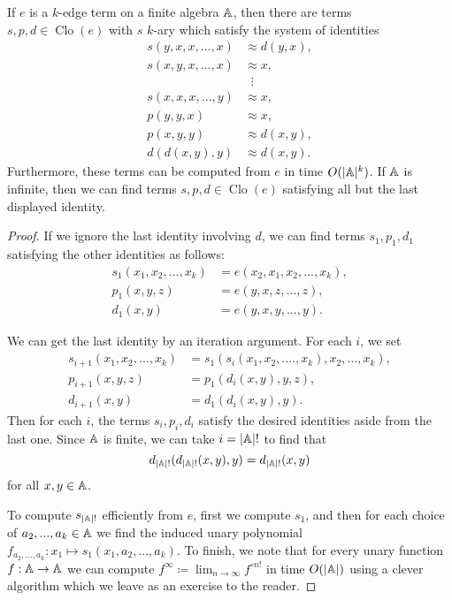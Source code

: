 \documentclass[letterpaper,11pt]{article}
\DeclareMathOperator{\Clo}{Clo}
\begin{document}
\begin{thm}\label{edge-spd} If $e$ is a $k$-edge term on a finite algebra $\mathbb{A}$, then there are terms $s,p,d \in \Clo(e)$ with $s$ $k$-ary which satisfy the system of identities
\begin{align*}
s(y,x,x,...,x) &\approx d(y,x),\\
s(x,y,x,...,x) &\approx x,\\
&\;\; \vdots\\
s(x,x,x,...,y) &\approx x,\\
p(y,y,x) &\approx x,\\
p(x,y,y) &\approx d(x,y),\\
d(d(x,y),y) &\approx d(x,y).
\end{align*}
Furthermore, these terms can be computed from $e$ in time $O(|\mathbb{A}|^k)$. If $\mathbb{A}$ is infinite, then we can find terms $s,p,d \in \Clo(e)$ satisfying all but the last displayed identity.
\end{thm}
\begin{proof} If we ignore the last identity involving $d$, we can find terms $s_1,p_1,d_1$ satisfying the other identities as follows:
\begin{align*}
s_1(x_1, x_2, ..., x_k) &= e(x_2,x_1,x_2, ..., x_k),\\
p_1(x,y,z) &= e(y,x,z,...,z),\\
d_1(x,y) &= e(y,x,y,...,y).
\end{align*}

We can get the last identity by an iteration argument. For each $i$, we set
\begin{align*}
s_{i+1}(x_1,x_2, ..., x_k) &= s_1(s_i(x_1,x_2,....,x_k),x_2,...,x_k),\\
p_{i+1}(x,y,z) &= p_1(d_i(x,y),y,z),\\
d_{i+1}(x,y) &= d_1(d_i(x,y),y).
\end{align*}
Then for each $i$, the terms $s_i,p_i,d_i$ satisfy the desired identities aside from the last one. Since $\mathbb{A}$ is finite, we can take $i = |\mathbb{A}|!$ to find that
\[
d_{|\mathbb{A}|!}(d_{|\mathbb{A}|!}(x,y),y) = d_{|\mathbb{A}|!}(x,y)
\]
for all $x,y \in \mathbb{A}$.

To compute $s_{|\mathbb{A}|!}$ efficiently from $e$, first we compute $s_1$, and then for each choice of $a_2, ..., a_k \in \mathbb{A}$ we find the induced unary polynomial $f_{a_2,...,a_k} : x_1 \mapsto s_1(x_1, a_2, ..., a_k)$. To finish, we note that for every unary function $f : \mathbb{A} \rightarrow \mathbb{A}$ we can compute $f^{\infty} \coloneqq \lim_{n \rightarrow \infty} f^{\circ n!}$ in time $O(|\mathbb{A}|)$ using a clever algorithm which we leave as an exercise to the reader.
\end{proof}
\end{document}
